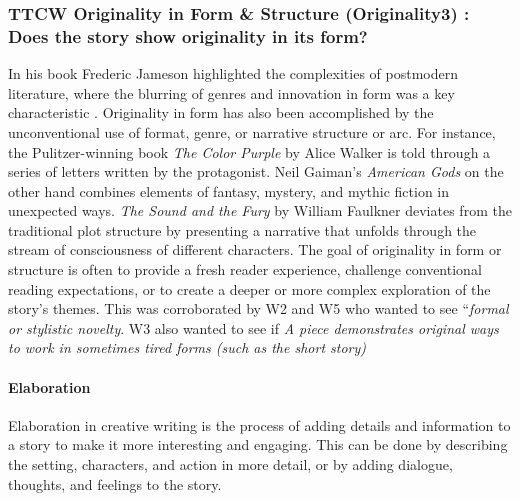 \subsubsection{\textbf{{\color{blue}TTCW Originality in Form \& Structure (Originality3)} : Does the story show originality in its form?}} In his book \citet{boardman1992narrative} Frederic Jameson highlighted the complexities of postmodern literature, where the blurring of genres and innovation in form was a key characteristic \citet{jameson1991postmodernism}. Originality in form has also been accomplished by the unconventional use of format, genre, or narrative structure or arc. For instance, the Pulitzer-winning book \textit{The Color Purple} by Alice Walker is told through a series of letters written by the protagonist. Neil Gaiman's \textit{American Gods} on the other hand combines elements of fantasy, mystery, and mythic fiction in unexpected ways. \textit{The Sound and the Fury} by William Faulkner deviates from the traditional plot structure by presenting a narrative that unfolds through the stream of consciousness of different characters. The goal of originality in form or structure is often to provide a fresh reader experience, challenge conventional reading expectations, or to create a deeper or more complex exploration of the story's themes. This was corroborated by W2 and W5 who wanted to see ``\textit{formal or stylistic novelty}. W3 also wanted to see if \textit{A piece demonstrates original ways to work in sometimes tired forms (such as the short story)}
\paragraph{\textbf{{{Elaboration}}}}
Elaboration in creative writing is the process of adding details and information to a story to make it more interesting and engaging. This can be done by describing the setting, characters, and action in more detail, or by adding dialogue, thoughts, and feelings to the story.

